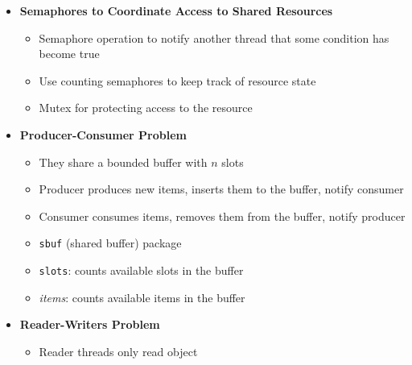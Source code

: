 \documentclass[12pt]{article}
\begin{document}
{\begin{itemize}
\begin{itemize}
				\item Associate a unique semaphore \textbf{mutex} (initially 1) with each shared var
				\item Surround corresponding critical sections with \texttt{P}, \texttt{V} operations
				\item \textit{Binary Semaphores}: Value is 0 or 1
				\item \textit{Mutex}: Binary semaphores for \textbf{mut}ual \textbf{ex}clusion
				\item \textit{Counting Semaphore}: Counter for set of available resources
				\item Synchronization makes programs run slower
				\item The semaphore invariant surrounds critical sections, which is the \textit{forbidden region}
				\item Semaphore is $<0$ in the forbidden region, therefore cannot be passed by any trajectory
			\end{itemize}
			\item \textbf{Semaphores to Coordinate Access to Shared Resources}
			\begin{itemize}
				\item Semaphore operation to notify another thread that some condition has become true
				\item Use counting semaphores to keep track of resource state
				\item Mutex for protecting access to the resource
			\end{itemize}
			\item \textbf{Producer-Consumer Problem}
			\begin{itemize}
				\item They share a bounded buffer with $n$ slots
				\item Producer produces new items, inserts them to the buffer, notify consumer
				\item Consumer consumes items, removes them from the buffer, notify producer
				\item \texttt{sbuf} (shared buffer) package
				\item \texttt{slots}: counts available slots in the buffer
				\item \textit{items}: counts available items in the buffer
			\end{itemize}
			\item \textbf{Reader-Writers Problem}
			\begin{itemize}
				\item Reader threads only read object

\end{itemize}
\end{itemize}}
\end{document}
